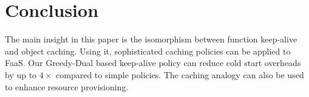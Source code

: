\section{Conclusion}

The main insight in this paper is the isomorphism between function keep-alive and object caching.
Using it, sophisticated caching policies can be applied to FaaS.
Our Greedy-Dual based keep-alive policy can reduce cold start overheads by up to $4\times$ compared to simple policies.
The caching analogy can also be used to enhance resource provisioning. 
